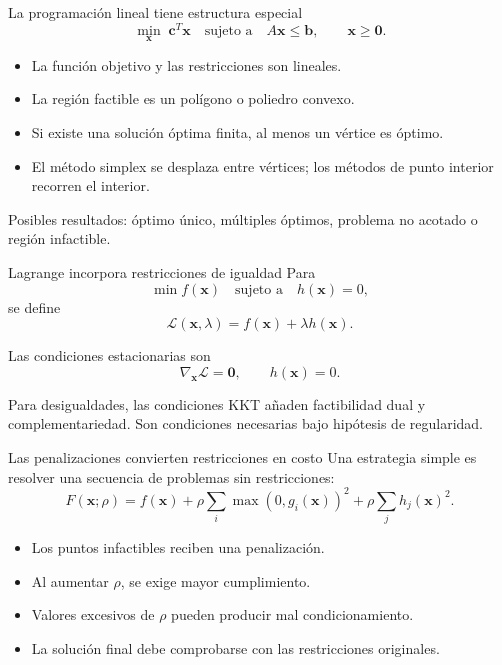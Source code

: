 \documentclass[../../main.tex]{subfiles}
\begin{document}
\begin{frame}{La programación lineal tiene estructura especial}
\[
\min_{\mathbf{x}}\;\mathbf{c}^{T}\mathbf{x}
\quad\text{sujeto a}\quad
A\mathbf{x}\le\mathbf{b},
\qquad
\mathbf{x}\ge\mathbf{0}.
\]

\begin{itemize}
  \item La función objetivo y las restricciones son lineales.
  \item La región factible es un polígono o poliedro convexo.
  \item Si existe una solución óptima finita, al menos un vértice es óptimo.
  \item El método simplex se desplaza entre vértices; los métodos de punto interior recorren el interior.
\end{itemize}

Posibles resultados: óptimo único, múltiples óptimos, problema no acotado o región infactible.
\end{frame}

\begin{frame}{Lagrange incorpora restricciones de igualdad}
Para
\[
\min f(\mathbf{x})
\quad \text{sujeto a} \quad h(\mathbf{x})=0,
\]
se define
\[
\mathcal{L}(\mathbf{x},\lambda)
=f(\mathbf{x})+\lambda h(\mathbf{x}).
\]

Las condiciones estacionarias son
\[
\nabla_{\mathbf{x}}\mathcal{L}=\mathbf{0},
\qquad
h(\mathbf{x})=0.
\]

Para desigualdades, las condiciones KKT añaden factibilidad dual y complementariedad. Son condiciones necesarias bajo hipótesis de regularidad.
\end{frame}

\begin{frame}{Las penalizaciones convierten restricciones en costo}
Una estrategia simple es resolver una secuencia de problemas sin restricciones:
\[
F(\mathbf{x};\rho)
=
f(\mathbf{x})
+
\rho\sum_i\max(0,g_i(\mathbf{x}))^2
+
\rho\sum_j h_j(\mathbf{x})^2.
\]

\begin{itemize}
  \item Los puntos infactibles reciben una penalización.
  \item Al aumentar $\rho$, se exige mayor cumplimiento.
  \item Valores excesivos de $\rho$ pueden producir mal condicionamiento.
  \item La solución final debe comprobarse con las restricciones originales.
\end{itemize}
\end{frame}
\end{document}

